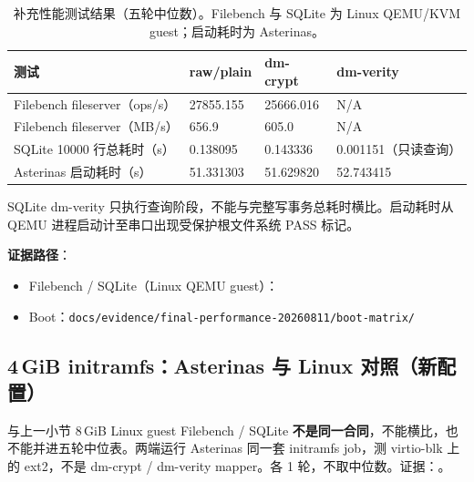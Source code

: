 \begin{table}[H]
    \centering
    \caption{补充性能测试结果（五轮中位数）。Filebench 与 SQLite 为 Linux QEMU/KVM guest；启动耗时为 Asterinas。}
    \begin{tabular}{p{}p{}p{}p{}}
        \toprule
        \textbf{测试} & \textbf{raw/plain} & \textbf{dm-crypt} & \textbf{dm-verity} \\
        \midrule
        Filebench fileserver（ops/s） & 27855.155 & 25666.016 & N/A \\
        Filebench fileserver（MB/s） & 656.9 & 605.0 & N/A \\
        SQLite 10000 行总耗时（s） & 0.138095 & 0.143336 & 0.001151（只读查询） \\
        Asterinas 启动耗时（s） & 51.331303 & 51.629820 & 52.743415 \\
        \bottomrule
    \end{tabular}
\end{table}

SQLite dm-verity 只执行查询阶段，不能与完整写事务总耗时横比。启动耗时从 QEMU 进程启动计至串口出现受保护根文件系统 PASS 标记。

\textbf{证据路径}：
\begin{itemize}
    \item Filebench / SQLite（Linux QEMU guest）：\texttt{}
    \item Boot：\texttt{docs/evidence/final-performance-20260811/boot-matrix/}
\end{itemize}

\subsection{4\,GiB initramfs：Asterinas 与 Linux 对照（新配置）}

与上一小节 8\,GiB Linux guest Filebench / SQLite \textbf{不是同一合同}，不能横比，也不能并进五轮中位表。两端运行 Asterinas 同一套 initramfs job，测 virtio-blk 上的 ext2，不是 dm-crypt / dm-verity mapper。各 1 轮，不取中位数。证据：\texttt{}。

